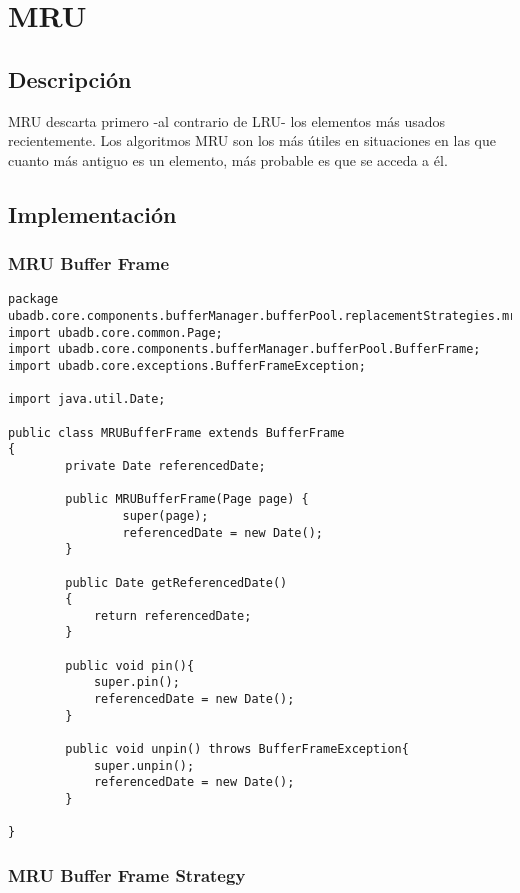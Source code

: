 \section{MRU}

\subsection{Descripción}

MRU descarta primero -al contrario de LRU- los elementos más usados recientemente.
Los algoritmos MRU son los más útiles en situaciones en las que cuanto más antiguo es un elemento, más probable es que se acceda a él.

\subsection{Implementación}
\subsubsection{MRU Buffer Frame}

\begin{lstlisting}
package ubadb.core.components.bufferManager.bufferPool.replacementStrategies.mru;
import ubadb.core.common.Page;
import ubadb.core.components.bufferManager.bufferPool.BufferFrame;
import ubadb.core.exceptions.BufferFrameException;

import java.util.Date;

public class MRUBufferFrame extends BufferFrame 
{
		private Date referencedDate;
	
        public MRUBufferFrame(Page page) {
                super(page); 
                referencedDate = new Date();
        }
        
        public Date getReferencedDate()
    	{
    		return referencedDate;
    	}
        
        public void pin(){
        	super.pin();
        	referencedDate = new Date();
        }
        
        public void unpin() throws BufferFrameException{
        	super.unpin();
        	referencedDate = new Date();
        }

}
\end{lstlisting}

\subsubsection{MRU Buffer Frame Strategy}

